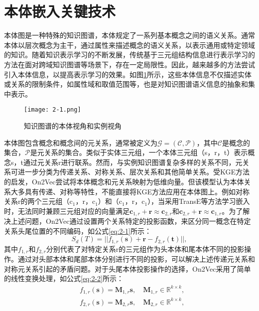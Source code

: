 \section{本体嵌入关键技术}
本体图是一种特殊的知识图谱，本体规定了一系列基本概念之间的语义关系。通常本体以层次概念为主干，通过属性来描述概念的语义关系，以表示通用或特定领域的知识。随着知识表示学习的不断发展，传统基于三元组结构信息进行表示学习的方法在面对跨域知识图谱等场景下，存在一定局限性。因此，越来越多的方法尝试引入本体信息，以提高表示学习的效果。如图\ref{fig:2-1}所示，这些本体信息不仅描述实体或关系的限制条件，如属性域和取值范围等，也是对知识图谱语义信息的抽象和集中表示。
\begin{figure}[h]
  \centering
  \texttt{[image: 2-1.png]}
  \caption{知识图谱的本体视角和实例视角}
  \label{fig:2-1}
\end{figure}

本体图包含概念和概念间的元关系，通常被定义为\(\mathcal{G} = (\mathcal{C},\mathcal{P})\)，其中\(\mathcal{C}\)是概念的集合，\(\mathcal{P}\)是元关系的集合。类似于实体三元组，一个本体三元组（s，r，t）表示概念s，t通过元关系r进行联系。然而，与实例知识图谱复杂多样的关系不同，元关系可进一步分类为传递关系、对称关系、层次关系和其他简单关系\cite{chen2018on2vec}。受KGE方法的启发，On2Vec\cite{chen2018on2vec}尝试将本体概念和元关系映射为低维向量。但该模型认为本体关系大多具有传递、对称等特性，不能直接将KGE方法应用在本体图上。例如对称关系r的两个三元组（c$_{1}$，r，c$_{1}$）和（c$_{1}$，r，c$_{1}$），当采用TransE等方法学习嵌入时，无法同时兼顾三元组对应的向量满足\(\textbf{c}_{1,r} + \textbf{r} ≈ \textbf{c}_{2,r}\)和\(\textbf{c}_{2,r} + \textbf{r} ≈ \textbf{c}_{1,r}\)。为了解决上述问题，On2Vec通过设置两个关系特定的投影函数，来区分同一概念在特定关系头尾位置的不同编码，如公式\ref{eq:2-1}所示：
\begin{equation}
  S_{d}(T) = || f_{1,r}(\textbf{s}) + \textbf{r} -f_{2,r}(\textbf{t})||,\label{eq:2-1}
\end{equation}
其中\(f_{1,r}\)和\(f_{2,r}\)分别代表了对特定关系r的三元组作为头本体和尾本体不同的投影操作。通过对头部本体和尾部本体分别进行不同的投影，可以解决上述传递元关系和对称元关系引起的矛盾问题。对于头尾本体投影操作的选择，On2Vec采用了简单的线性变换处理，如公式\ref{eq:2-2}所示：
\begin{equation}
  \begin{aligned} 
    &f_{1,r}(\textbf{s}) = \textbf{M}_{1,r}\textbf{s}, \quad\textbf{M}_{1,r} \in \mathbb{R}^{k \times k}, \\
    &f_{2,r}(\textbf{s}) = \textbf{M}_{2,r}\textbf{s}, \quad\textbf{M}_{2,r} \in \mathbb{R}^{k \times k},
    \end{aligned} \label{eq:2-2}
\end{equation}

